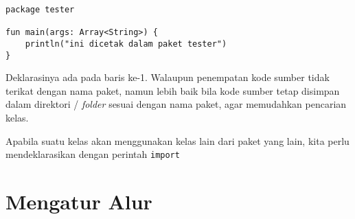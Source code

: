 \begin{lstlisting}
package tester

fun main(args: Array<String>) {
	println("ini dicetak dalam paket tester")
}
\end{lstlisting}

Deklarasinya ada pada baris ke-1. Walaupun penempatan kode sumber tidak terikat dengan nama paket, namun lebih baik bila kode sumber tetap disimpan dalam direktori / \textit{folder} sesuai dengan nama paket, agar memudahkan pencarian kelas.

Apabila suatu kelas akan menggunakan kelas lain dari paket yang lain, kita perlu mendeklarasikan dengan perintah \texttt{import}

\section{Mengatur Alur}

